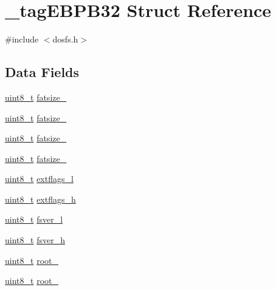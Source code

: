 \hypertarget{struct__tag_e_b_p_b32}{\section{\-\_\-tag\-E\-B\-P\-B32 Struct Reference}
\label{struct__tag_e_b_p_b32}
}


{\ttfamily \#include $<$dosfs.\-h$>$}

\subsection*{Data Fields}
\begin{DoxyCompactItemize}
\item 
\hyperlink{stdint_8h_aba7bc1797add20fe3efdf37ced1182c5}{uint8\-\_\-t} \hyperlink{struct__tag_e_b_p_b32_a079b4763fb3928d3f4376692acdd7730}{fatsize\-\_}
\item 
\hyperlink{stdint_8h_aba7bc1797add20fe3efdf37ced1182c5}{uint8\-\_\-t} \hyperlink{struct__tag_e_b_p_b32_af7c84014e0db195db7eeccb5bb1ce0c0}{fatsize\-\_}
\item 
\hyperlink{stdint_8h_aba7bc1797add20fe3efdf37ced1182c5}{uint8\-\_\-t} \hyperlink{struct__tag_e_b_p_b32_a5dfa1e6ae53e14ff8a4e7ac14a482928}{fatsize\-\_}
\item 
\hyperlink{stdint_8h_aba7bc1797add20fe3efdf37ced1182c5}{uint8\-\_\-t} \hyperlink{struct__tag_e_b_p_b32_a3284256e5fedb816e670af303832ad16}{fatsize\-\_}
\item 
\hyperlink{stdint_8h_aba7bc1797add20fe3efdf37ced1182c5}{uint8\-\_\-t} \hyperlink{struct__tag_e_b_p_b32_a3f4ae0cadf87f63694a33a8a1d4bb34e}{extflags\-\_\-l}
\item 
\hyperlink{stdint_8h_aba7bc1797add20fe3efdf37ced1182c5}{uint8\-\_\-t} \hyperlink{struct__tag_e_b_p_b32_abf867dd5ac5cfe091026932db11958be}{extflags\-\_\-h}
\item 
\hyperlink{stdint_8h_aba7bc1797add20fe3efdf37ced1182c5}{uint8\-\_\-t} \hyperlink{struct__tag_e_b_p_b32_a5f36cdcdb07ee83cd90fe3781ff856be}{fsver\-\_\-l}
\item 
\hyperlink{stdint_8h_aba7bc1797add20fe3efdf37ced1182c5}{uint8\-\_\-t} \hyperlink{struct__tag_e_b_p_b32_aaaeea8c75edd61a8107a9080abe65b98}{fsver\-\_\-h}
\item 
\hyperlink{stdint_8h_aba7bc1797add20fe3efdf37ced1182c5}{uint8\-\_\-t} \hyperlink{struct__tag_e_b_p_b32_adb036e32413b53db24e54140a32abfbf}{root\-\_}
\item 
\hyperlink{stdint_8h_aba7bc1797add20fe3efdf37ced1182c5}{uint8\-\_\-t} \hyperlink{struct__tag_e_b_p_b32_a609505eb20b2149064beb81364488b6c}{root\-\_}

\end{DoxyCompactItemize}
